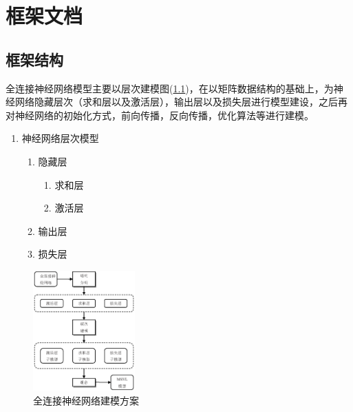 \documentclass[UTF-8]{progbookcn}
\begin{document}
\part{框架文档}
\chapter{框架结构}

全连接神经网络模型主要以层次建模图(\ref{fig:FCNNFrame})，在以矩阵数据结构的基础上，为神经网络隐藏层次（求和层以及激活层），输出层以及损失层进行模型建设，之后再对神经网络的初始化方式，前向传播，反向传播，优化算法等进行建模。

\begin{enumerate}
  \item 神经网络层次模型
  \begin{enumerate}
    \item 隐藏层
    \begin{enumerate}
      \item 求和层
      \item 激活层
    \end{enumerate}
    \item 输出层
    \item 损失层
  \end{enumerate}
\end{enumerate}



\begin{figure}[!h]%
  \centering
  \includegraphics[width=0.35\textwidth]{FCNN.eps}
  \caption{全连接神经网络建模方案}
  \label{fig:FCNNFrame}
\end{figure}



\end{document}
